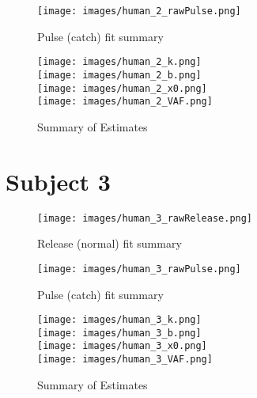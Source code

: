 \documentclass[12pt]{spie}
\begin{document}
\begin{figure}[H]
\begin{center}
\texttt{[image: images/human\_2\_rawPulse.png]}
\caption[]{Pulse (catch) fit summary}
\end{center}
\end{figure}

\begin{figure}[H]
\begin{center}
\texttt{[image: images/human\_2\_k.png]} \\
\texttt{[image: images/human\_2\_b.png]} \\
\texttt{[image: images/human\_2\_x0.png]} \\
\texttt{[image: images/human\_2\_VAF.png]} \\
\caption[]{Summary of Estimates}
\end{center}
\end{figure}

\section{Subject 3}

\begin{figure}[H]
\begin{center}
\texttt{[image: images/human\_3\_rawRelease.png]}
\caption[]{Release (normal) fit summary}
\end{center}
\end{figure}

\begin{figure}[H]
\begin{center}
\texttt{[image: images/human\_3\_rawPulse.png]}
\caption[]{Pulse (catch) fit summary}
\end{center}
\end{figure}

\begin{figure}[H]
\begin{center}
\texttt{[image: images/human\_3\_k.png]} \\
\texttt{[image: images/human\_3\_b.png]} \\
\texttt{[image: images/human\_3\_x0.png]} \\
\texttt{[image: images/human\_3\_VAF.png]} \\
\caption[]{Summary of Estimates}
\end{center}
\end{figure}
\end{document}
